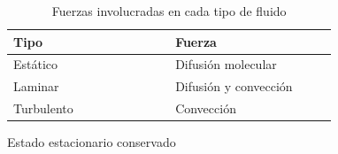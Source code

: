 \begin{table}[H]\centering
    \caption{Fuerzas involucradas en cada tipo de fluido}
    \label{tab:fuerzas_por_tipo_de_fluido}
    \begin{threeparttable}
    {\tabstyle
    \begin{tabular}{m{0.4\linewidth}m{0.4\linewidth}}\hline
        \textbf{Tipo} & \textbf{Fuerza} \\ \hline    
        
        Estático\tnote{1} & Difusión molecular \\
        Laminar           & Difusión y convección \\
        Turbulento        & Convección \\
    
    \hline\end{tabular}}

\begin{tablenotes}\scriptsize
    \item[1] Estado estacionario conservado
\end{tablenotes}
    
\end{threeparttable}\end{table}
